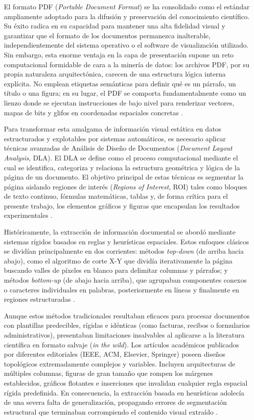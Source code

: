 \documentclass[a4paper]{report}
\begin{document}
El formato PDF (\textit{Portable Document Format}) se ha consolidado como el estándar ampliamente adoptado para la difusión y preservación del conocimiento científico. Su éxito radica en su capacidad para mantener una alta fidelidad visual y garantizar que el formato de los documentos permanezca inalterable, independientemente del sistema operativo o el software de visualización utilizado. Sin embargo, esta enorme ventaja en la capa de presentación supone un reto computacional formidable de cara a la minería de datos: los archivos PDF, por su propia naturaleza arquitectónica, carecen de una estructura lógica interna explícita. No emplean etiquetas semánticas para definir qué es un párrafo, un título o una figura; en su lugar, el PDF se comporta fundamentalmente como un lienzo donde se ejecutan instrucciones de bajo nivel para renderizar vectores, mapas de bits y glifos en coordenadas espaciales concretas \cite{clark2016pdffigures}.

Para transformar esta amalgama de información visual estática en datos estructurados y explotables por sistemas automáticos, es necesario aplicar técnicas avanzadas de Análisis de Diseño de Documentos (\textit{Document Layout Analysis}, DLA). El DLA se define como el proceso computacional mediante el cual se identifica, categoriza y relaciona la estructura geométrica y lógica de la página de un documento. El objetivo principal de estas técnicas es segmentar la página aislando regiones de interés (\textit{Regions of Interest}, ROI) tales como bloques de texto continuo, fórmulas matemáticas, tablas y, de forma crítica para el presente trabajo, los elementos gráficos y figuras que encapsulan los resultados experimentales \cite{binmakhashen2019document}.

Históricamente, la extracción de información documental se abordó mediante sistemas rígidos basados en reglas y heurísticas espaciales. Estos enfoques clásicos se dividían principalmente en dos corrientes: métodos \textit{top-down} (de arriba hacia abajo), como el algoritmo de corte X-Y que dividía iterativamente la página buscando valles de píxeles en blanco para delimitar columnas y párrafos; y métodos \textit{bottom-up} (de abajo hacia arriba), que agrupaban componentes conexos o caracteres individuales en palabras, posteriormente en líneas y finalmente en regiones estructuradas \cite{binmakhashen2019document}.

Aunque estos métodos tradicionales resultaban eficaces para procesar documentos con plantillas predecibles, rígidas e idénticas (como facturas, recibos o formularios administrativos), presentaban limitaciones insalvables al aplicarse a la literatura científica en formato salvaje (\textit{in the wild}). Los artículos académicos publicados por diferentes editoriales (IEEE, ACM, Elsevier, Springer) poseen diseños topológicos extremadamente complejos y variables. Incluyen arquitecturas de múltiples columnas, figuras de gran tamaño que rompen los márgenes establecidos, gráficos flotantes e inserciones que invalidan cualquier regla espacial rígida predefinida. En consecuencia, la extracción basada en heurísticas adolecía de una severa falta de generalización, propagando errores de segmentación estructural que terminaban corrompiendo el contenido visual extraído \cite{zhong2019publaynet}.
\end{document}
